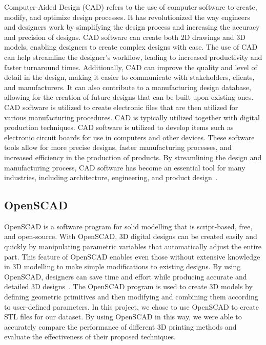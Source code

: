 \documentclass[sigconf,authorversion,nonacm]{acmart}
\begin{document}
Computer-Aided Design (CAD) refers to the use of computer software to create, modify, and optimize design processes.
It has revolutionized the way engineers and designers work by simplifying the design process and increasing the accuracy and precision of designs.
CAD software can create both 2D drawings and 3D models, enabling designers to create complex designs with ease.
The use of CAD can help streamline the designer's workflow, leading to increased productivity and faster turnaround times.
Additionally, CAD can improve the quality and level of detail in the design, making it easier to communicate with stakeholders, clients, and manufacturers.
It can also contribute to a manufacturing design database, allowing for the creation of future designs that can be built upon existing ones.
CAD software is utilized to create electronic files that are then utilized for various manufacturing procedures.
CAD is typically utilized together with digital production techniques.
CAD software is utilized to develop items such as electronic circuit boards for use in computers and other devices.
These software tools allow for more precise designs, faster manufacturing processes, and increased efficiency in the production of products.
By streamlining the design and manufacturing process, CAD software has become an essential tool for many industries, including architecture, engineering, and product design~\cite{chai_2020}.

\subsection{OpenSCAD}

OpenSCAD is a software program for solid modelling that is script-based, free, and open-source.
With OpenSCAD, 3D digital designs can be created easily and quickly by manipulating parametric variables that automatically adjust the entire part.
This feature of OpenSCAD enables even those without extensive knowledge in 3D modelling to make simple modifications to existing designs.
By using OpenSCAD, designers can save time and effort while producing accurate and detailed 3D designs~\cite{pearce2015applications}.
The OpenSCAD program is used to create 3D models by defining geometric primitives and then modifying and combining them according to user-defined parameters.
In this project, we chose to use OpenSCAD to create STL files for our dataset.
By using OpenSCAD in this way, we were able to accurately compare the performance of different 3D printing methods and evaluate the effectiveness of their proposed techniques.
\end{document}

